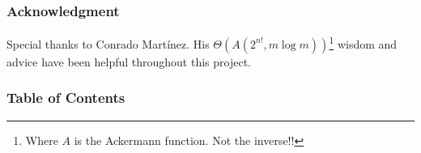 \documentclass{beamer}
\begin{document}
\frame{\titlepage}

\begin{frame}
\frametitle{Acknowledgment}
Special thanks to Conrado Martínez. 
His $\Theta(A(2^{n!}, m\log m))$\footnote{Where $A$ is the Ackermann function. Not the inverse!!} 
wisdom and advice  have been helpful throughout this project.
\end{frame}

\begin{frame}
    \frametitle{Table of Contents}
    \tableofcontents
\end{frame}
\end{document}
